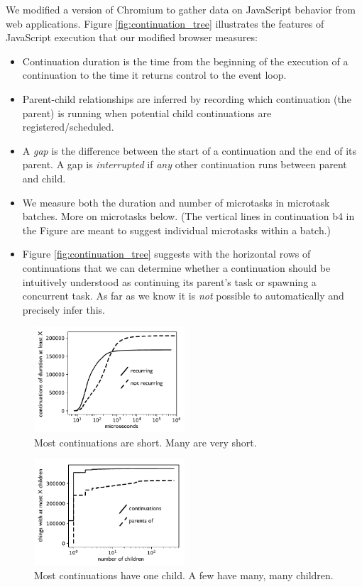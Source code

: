\documentclass[acmsmall,anonymous,review]{acmart}\settopmatter{printfolios=true,printccs=false,printacmref=false}
\begin{document}
We modified a version of Chromium to gather data on JavaScript behavior from web applications.
Figure \ref{fig:continuation_tree} illustrates the features of JavaScript execution that our modified browser measures:

\begin{itemize}
\item Continuation duration is the time from the beginning of the execution of a continuation to the time it returns control to the event loop.
\item Parent-child relationships are inferred by recording which continuation (the parent) is running when potential child continuations are registered/scheduled.
\item A \emph{gap} is the difference between the start of a continuation and the end of its parent.
  A gap is \emph{interrupted} if \emph{any} other continuation runs between parent and child.
\item We measure both the duration and number of microtasks in microtask batches.
  More on microtasks below.
  (The vertical lines in continuation b4 in the Figure are meant to suggest individual microtasks within a batch.)
\item Figure \ref{fig:continuation_tree} suggests with the horizontal rows of continuations that we can determine whether a continuation should be intuitively understood as continuing its parent's task or spawning a concurrent task.
  As far as we know it is \emph{not} possible to automatically and precisely infer this.
\end{itemize}

\begin{figure}
\hspace*{-0.2cm}\includegraphics[width=0.5\textwidth]{duration_graph_bw}
\caption{Most continuations are short.
  Many are very short.}
\label{fig:graph_duration}
\end{figure}

\begin{figure}
\hspace*{-0.2cm}\includegraphics[width=0.5\textwidth]{children_graph_bw}
\caption{Most continuations have one child.
A few have many, many children.}
\label{fig:graph_branching}
\end{figure}
\end{document}
